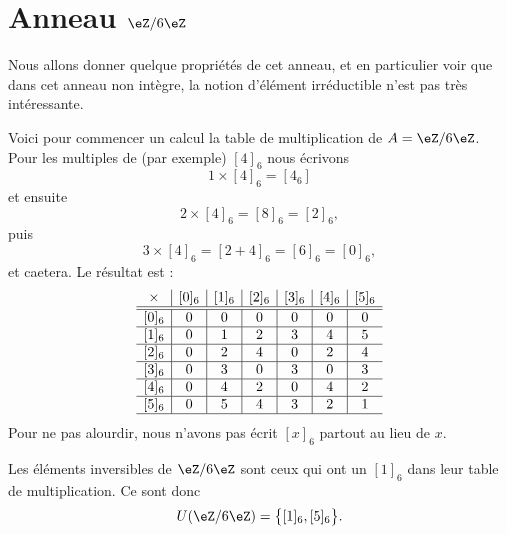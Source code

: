 \section{Anneau \( \eZ/6\eZ\)}
\label{SECooSWGKooEeOZTO}

Nous allons donner quelque propriétés de cet anneau, et en particulier voir que dans cet anneau non intègre, la notion d'élément irréductible n'est pas très intéressante.

Voici pour commencer un calcul la table de multiplication de \( A=\eZ/6\eZ\). Pour les multiples de (par exemple) \( [4]_6\) nous écrivons
\begin{equation}
    1\times [4]_6=[4_6]
\end{equation}
et ensuite
\begin{equation}
    2\times [4]_6=[8]_6=[2]_6,
\end{equation}
puis
\begin{equation}
    3\times [4]_6=[2+4]_6=[6]_6=[0]_6,
\end{equation}
et caetera. Le résultat est :
\begin{equation}
\begin{array}{c|c|c|c|c|c|c}
    \times & [0]_6 & [1]_6  & [2]_6  & [3]_6 & [4]_6 & [5]_6  \\
\hline\hline
[0]_6 & 0 & 0 & 0 & 0 & 0 & 0 \\ 
\hline
[1]_6  & 0 & 1 & 2 & 3 & 4 & 5 \\ 
\hline
[2]_6 & 0 & 2 & 4 & 0 & 2 & 4 \\ 
\hline
[3]_6 & 0 & 3 & 0 & 3 & 0 & 3 \\ 
\hline
[4]_6 & 0 & 4 & 2 & 0 & 4 & 2 \\ 
\hline
[5]_6 & 0 & 5 & 4 & 3 & 2 & 1 \\ 
\hline
\end{array}
\end{equation}
Pour ne pas alourdir, nous n'avons pas écrit \( [x]_6\) partout au lieu de \( x\).

\begin{normaltext}[Inversibles]
    Les éléments inversibles de \( \eZ/6\eZ\) sont ceux qui ont un \( [1]_6\) dans leur table de multiplication. Ce sont donc
    \begin{equation}
        U(\eZ/6\eZ)=\big\{ [1]_6,[5]_6 \big\}.
    \end{equation}
\end{normaltext}

